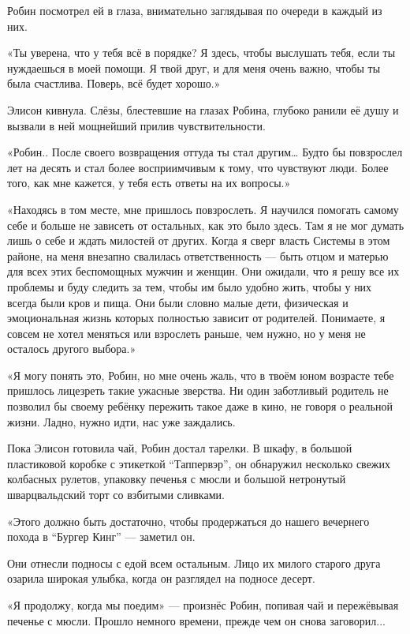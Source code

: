 \documentclass[a5paper, 9pt,
final, openany, twoside=true]{memoir}
\begin{document}
Робин посмотрел ей в глаза, внимательно заглядывая по очереди в каждый из них.

«Ты уверена, что у тебя всё в порядке? Я здесь, чтобы выслушать тебя, если ты нуждаешься в моей помощи. Я твой друг, и для меня очень важно, чтобы ты была счастлива. Поверь, всё будет хорошо.»

Элисон кивнула. Слёзы, блестевшие на глазах Робина, глубоко ранили её душу и вызвали в ней мощнейший прилив чувствительности.

«Робин.. После своего возвращения оттуда ты стал другим… Будто бы повзрослел лет на десять и стал более восприимчивым к тому, что чувствуют люди. Более того, как мне кажется, у тебя есть ответы на их вопросы.»

«Находясь в том месте, мне пришлось повзрослеть. Я научился помогать самому себе и больше не зависеть от остальных, как это было здесь. Там я не мог думать лишь о себе и ждать милостей от других. Когда я сверг власть Системы в этом районе, на меня внезапно свалилась ответственность — быть отцом и матерью для всех этих беспомощных мужчин и женщин. Они ожидали, что я решу все их проблемы и буду следить за тем, чтобы им было удобно жить, чтобы у них всегда были кров и пища. Они были словно малые дети, физическая и эмоциональная жизнь которых полностью зависит от родителей. Понимаете, я совсем не хотел меняться или взрослеть раньше, чем нужно, но у меня не осталось другого выбора.»

«Я могу понять это, Робин, но мне очень жаль, что в твоём юном возрасте тебе пришлось лицезреть такие ужасные зверства. Ни один заботливый родитель не позволил бы своему ребёнку пережить такое даже в кино, не говоря о реальной жизни. Ладно, нужно идти, нас уже заждались.\bigskip

Пока Элисон готовила чай, Робин достал тарелки. В шкафу, в большой пластиковой коробке с этикеткой ``Таппервэр'', он обнаружил несколько свежих колбасных рулетов, упаковку печенья с мюсли и большой нетронутый шварцвальдский торт со взбитыми сливками.

«Этого должно быть достаточно, чтобы продержаться до нашего вечернего похода в ``Бургер Кинг'' — заметил он.

Они отнесли подносы с едой всем остальным. Лицо их милого старого друга озарила широкая улыбка, когда он разглядел на подносе десерт.

«Я продолжу, когда мы поедим» — произнёс Робин, попивая чай и пережёвывая печенье с мюсли. Прошло немного времени, прежде чем он снова заговорил...
\end{document}
